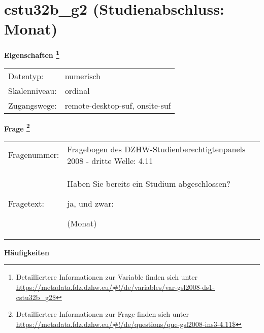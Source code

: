 
    \setcounter{footnote}{0}

    \vspace*{-1.8cm}
	\section{cstu32b\_g2 (Studienabschluss: Monat)}
	\label{section:cstu32b_g2}



    \vspace*{0.5cm}
    \noindent\textbf{Eigenschaften
	\footnote{Detailliertere Informationen zur Variable finden sich unter
		\url{https://metadata.fdz.dzhw.eu/\#!/de/variables/var-gsl2008-ds1-cstu32b_g2$}}}\\
	\begin{tabularx}{\hsize}{@{}lX}
	Datentyp: & numerisch \\
	Skalenniveau: & ordinal \\
	Zugangswege: &
	  remote-desktop-suf, 
	  onsite-suf
 \\
    \end{tabularx}



				\vspace*{0.5cm}
                \noindent\textbf{Frage
	                \footnote{Detailliertere Informationen zur Frage finden sich unter
		              \url{https://metadata.fdz.dzhw.eu/\#!/de/questions/que-gsl2008-ins3-4.11$}}}\\
				\begin{tabularx}{\hsize}{@{}lX}
					Fragenummer: &
					  Fragebogen des DZHW-Studienberechtigtenpanels 2008 - dritte Welle:
					  4.11
 \\
					Fragetext: & Haben Sie bereits ein Studium abgeschlossen?\par  ja, und zwar:\par  (Monat) \\
				\end{tabularx}





        		\vspace*{0.5cm}
                \noindent\textbf{Häufigkeiten}

